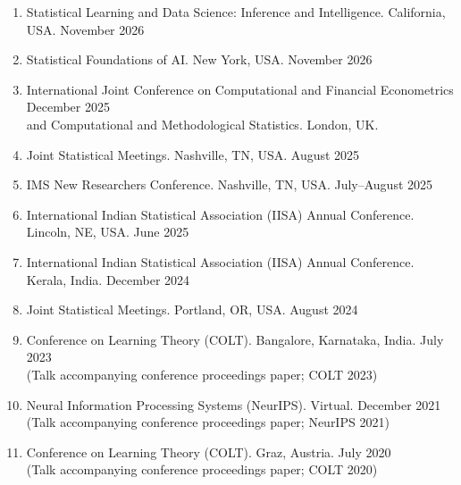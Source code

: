 \documentclass[letterpaper,oneside]{article}
\begin{document}
\begin{enumerate}

  \item[@] Statistical Learning and Data Science: Inference and Intelligence. California, USA. \hfill November 2026
  
  \item[@] Statistical Foundations of AI. New York, USA. \hfill November 2026
  
  
  \item [@] International Joint Conference on Computational and Financial Econometrics
  \hfill December 2025
  \\ and Computational and Methodological Statistics. London, UK.


  \item[+] Joint Statistical Meetings. Nashville, TN, USA. \hfill August 2025

  \item[+] IMS New Researchers Conference. Nashville, TN, USA. \hfill July--August 2025
  
	
  \item[@] International Indian Statistical Association (IISA) Annual Conference. Lincoln, NE, USA. \hfill June 2025

  \item[@] International Indian Statistical Association (IISA) Annual Conference. Kerala, India. \hfill December 2024

  \item[+] Joint Statistical Meetings. Portland, OR, USA. \hfill August 2024

  \item[+\&] Conference on Learning Theory (COLT). Bangalore, Karnataka, India. \hfill July 2023\\
  (Talk accompanying conference proceedings paper; COLT 2023)

  \item[+\&] Neural Information Processing Systems (NeurIPS). Virtual. \hfill December 2021\\
  (Talk accompanying conference proceedings paper; NeurIPS 2021)

  \item[+\&] Conference on Learning Theory (COLT). Graz, Austria. \hfill July 2020\\
  (Talk accompanying conference proceedings paper; COLT 2020)

\end{enumerate}
\end{document}
